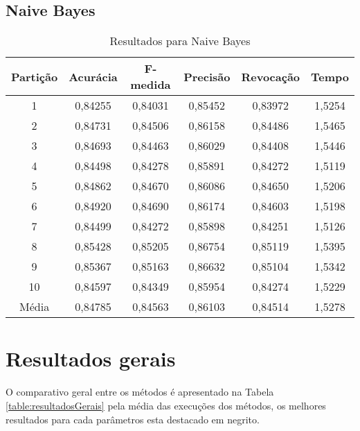 \subsection{Naive Bayes}

\begin{table}[h]
\centering
\caption{Resultados para Naive Bayes}
\vspace{0.2cm}
\begin{tabular}{c|c|c|c|c|c}
Partição & Acurácia & F-medida & Precisão & Revocação & Tempo \\
\hline
1  & 0,84255 & 0,84031 & 0,85452 & 0,83972 & 1,5254 \\
2  & 0,84731 & 0,84506 & 0,86158 & 0,84486 & 1,5465 \\
3  & 0,84693 & 0,84463 & 0,86029 & 0,84408 & 1,5446 \\
4  & 0,84498 & 0,84278 & 0,85891 & 0,84272 & 1,5119 \\
5  & 0,84862 & 0,84670 & 0,86086 & 0,84650 & 1,5206 \\
6  & 0,84920 & 0,84690 & 0,86174 & 0,84603 & 1,5198 \\
7  & 0,84499 & 0,84272 & 0,85898 & 0,84251 & 1,5126 \\
8  & 0,85428 & 0,85205 & 0,86754 & 0,85119 & 1,5395 \\
9  & 0,85367 & 0,85163 & 0,86632 & 0,85104 & 1,5342 \\
10 & 0,84597 & 0,84349 & 0,85954 & 0,84274 & 1,5229 \\
\hline
Média & 0,84785 & 0,84563 & 0,86103 & 0,84514 & 1,5278 \\

\end{tabular} 
\label{table:resultadosNB}
\end{table}

\section{Resultados gerais}

O comparativo geral entre os métodos é apresentado na Tabela \ref{table:resultadosGerais} pela média das execuções dos métodos, os melhores resultados para cada parâmetros esta destacado em negrito.

